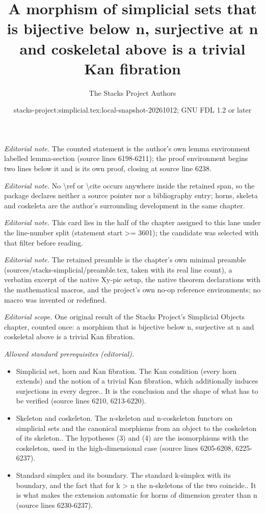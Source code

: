 \documentclass{stacks-project}
\title{A morphism of simplicial sets that is bijective below n, surjective at n and coskeletal above is a trivial Kan fibration}
\author{The Stacks Project Authors}
\date{stacks-project:simplicial.tex:local-snapshot-20261012; GNU FDL 1.2 or later}
\theoremstyle{plain}
\theoremstyle{definition}
\theoremstyle{remark}
\numberwithin{equation}{subsection}
\begin{document}
\maketitle
\noindent\textit{Editorial note.} The counted statement is the author's own lemma environment labelled lemma-section (source lines 6198-6211); the proof environment begins two lines below it and is its own proof, closing at source line 6238.\par\medskip
\noindent\textit{Editorial note.} No \textbackslash{}ref or \textbackslash{}cite occurs anywhere inside the retained span, so the package declares neither a source pointer nor a bibliography entry; horns, skeleta and coskeleta are the author's surrounding development in the same chapter.\par\medskip
\noindent\textit{Editorial note.} This card lies in the half of the chapter assigned to this lane under the line-number split (statement start >= 3601); the candidate was selected with that filter before reading.\par\medskip
\noindent\textit{Editorial note.} The retained preamble is the chapter's own minimal preamble (sources/stacks-simplicial/preamble.tex, taken with its real line count), a verbatim excerpt of the native Xy-pic setup, the native theorem declarations with the mathematical macros, and the project's own no-op reference environments; no macro was invented or redefined.\par\medskip
\noindent\textit{Editorial scope.} One original result of the Stacks Project's Simplicial Objects chapter, counted once: a morphism that is bijective below n, surjective at n and coskeletal above is a trivial Kan fibration.\par\medskip
\noindent\textit{Allowed standard prerequisites (editorial).}\begin{itemize}
\item Simplicial set, horn and Kan fibration. The Kan condition (every horn extends) and the notion of a trivial Kan fibration, which additionally induces surjections in every degree.. It is the conclusion and the shape of what has to be verified (source lines 6210, 6213-6220).
\item Skeleton and coskeleton. The n-skeleton and n-coskeleton functors on simplicial sets and the canonical morphisms from an object to the coskeleton of its skeleton.. The hypotheses (3) and (4) are the isomorphisms with the coskeleton, used in the high-dimensional case (source lines 6205-6208, 6225-6237).
\item Standard simplex and its boundary. The standard k-simplex with its boundary, and the fact that for k > n the n-skeletons of the two coincide.. It is what makes the extension automatic for horns of dimension greater than n (source lines 6230-6237).
\end{itemize}\medskip
\end{document}
